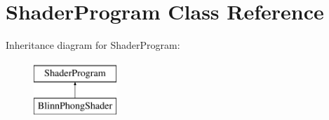 \hypertarget{class_shader_program}{}\section{Shader\+Program Class Reference}
\label{class_shader_program}
Inheritance diagram for Shader\+Program\+:\begin{figure}[H]
\begin{center}
\leavevmode
\includegraphics[height=2.000000cm]{class_shader_program}
\end{center}
\end{figure}
